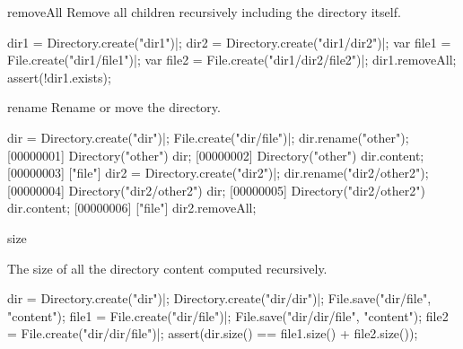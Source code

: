 \begin{urbiscriptapi}
\item[removeAll]
  Remove all children recursively including the directory itself.
\begin{urbiscript}
dir1 = Directory.create("dir1")|;
dir2 = Directory.create("dir1/dir2")|;
var file1 = File.create("dir1/file1")|;
var file2 = File.create("dir1/dir2/file2")|;
dir1.removeAll;
assert(!dir1.exists);
\end{urbiscript}

\item[rename]
  Rename or move the directory.
\begin{urbiscript}
dir = Directory.create("dir")|;
File.create("dir/file")|;
dir.rename("other");
[00000001] Directory("other")
dir;
[00000002] Directory("other")
dir.content;
[00000003] ["file"]
dir2 = Directory.create("dir2")|;
dir.rename("dir2/other2");
[00000004] Directory("dir2/other2")
dir;
[00000005] Directory("dir2/other2")
dir.content;
[00000006] ["file"]
dir2.removeAll;
\end{urbiscript}

\item[size]
  \experimental{}

  The size of all the directory content computed recursively.
\begin{urbiscript}
dir = Directory.create("dir")|;
Directory.create("dir/dir")|;
File.save("dir/file", "content");
file1 = File.create("dir/file")|;
File.save("dir/dir/file", "content");
file2 = File.create("dir/dir/file")|;
assert(dir.size() == file1.size() + file2.size());
\end{urbiscript}
\end{urbiscriptapi}

